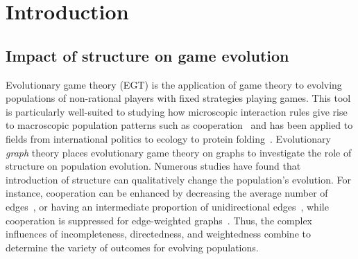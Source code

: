 \documentclass[pdflatex,lineno,referee,sn-nature]{sn-jnl}
\begin{document}
\maketitle

\section{Introduction}
\subsection{Impact of structure on game evolution}
Evolutionary game theory (EGT) is the application
of game theory to evolving populations
of non-rational players with fixed strategies playing games.
This tool is particularly well-suited to studying how microscopic interaction rules
give rise to macroscopic population patterns
such as cooperation~\citep[\eg{}][and references therein]{sigmund1999evolutionary}
and has been applied to fields from international politics to ecology
to protein folding~\citep[\cf{}][and references therein]{traulsen2023future}.
Evolutionary \emph{graph} theory places evolutionary game theory
on graphs to investigate the role of structure on population evolution.
Numerous studies have found that introduction of structure
can qualitatively change the population's evolution.
For instance, cooperation can be enhanced by
decreasing the average number of edges~\citep{ohtsuki2006simple},
or having an intermediate proportion
of unidirectional edges~\citep{su2022evolution},
while cooperation is suppressed
for edge-weighted graphs~\citep{bhaumik2024constant}.
Thus, the complex influences of
incompleteness, directedness, and weightedness combine
to determine the variety of outcomes for evolving populations.
\end{document}
